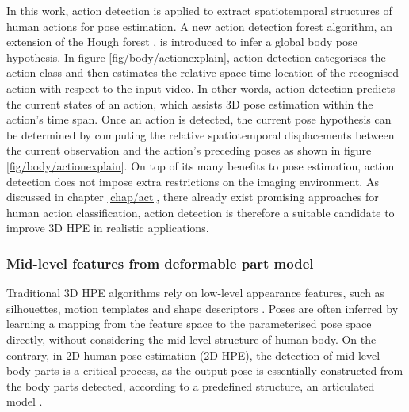 In this work, action detection is applied to extract spatiotemporal structures of human actions for pose estimation. A new action detection forest algorithm, an extension of the Hough forest \cite{Gall2009}, is introduced to infer a global body pose hypothesis.   
In figure \ref{fig/body/actionexplain}, action detection categorises the action class and then estimates the relative space-time location of the recognised action with respect to the input video. In other words, action detection predicts the current states of an action, which assists 3D pose estimation within the action's time span. Once an action is detected, the current pose hypothesis can be determined by computing the relative spatiotemporal displacements between the current observation and the action's preceding poses as shown in figure \ref{fig/body/actionexplain}.   
On top of its many benefits to pose estimation, action detection does not impose extra restrictions on the imaging environment. As discussed in chapter \ref{chap/act}, there already exist promising approaches for human action classification, action detection is therefore a suitable candidate to improve 3D HPE in realistic applications.   

\subsubsection{Mid-level features from deformable part model} 

Traditional 3D HPE algorithms rely on low-level appearance features, such as silhouettes, motion templates and shape descriptors \cite{Hogg1983, Rogez2012, Navaratnam2006, Pons-Moll2011, Sigal2012}. Poses are often inferred by learning a mapping from the feature space to the parameterised pose space directly, without considering the mid-level structure of human body.  
On the contrary, in 2D human pose estimation (2D HPE), the detection of mid-level body parts is a critical process, as the output pose is essentially constructed from the body parts detected, according to a predefined structure, \eg an articulated model \cite{Felzenszwalb2000, Andriluka2009, Yang2011, Eichner2012}.

